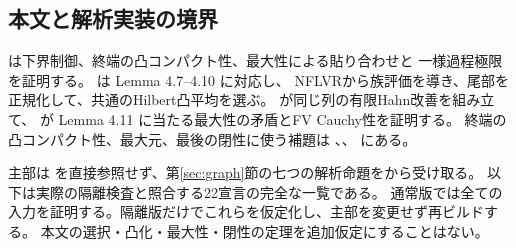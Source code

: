 \subsection*{本文と解析実装の境界}
 は下界制御、終端の凸コンパクト性、最大性による貼り合わせと
一様過程極限を証明する。 は Lemma 4.7--4.10 に対応し、
NFLVRから族評価を導き、尾部を正規化して、共通のHilbert凸平均を選ぶ。
 が同じ列の有限Hahn改善を組み立て、
 が Lemma 4.11 に当たる最大性の矛盾とFV Cauchy性を証明する。
終端の凸コンパクト性、最大元、最後の閉性に使う補題は
、、 にある。

主部は  を直接参照せず、第\ref{sec:graph}節の七つの解析命題をから受け取る。
以下は実際の隔離検査と照合する22宣言の完全な一覧である。
通常版では全ての入力を証明する。隔離版だけでこれらを仮定化し、主部を変更せず再ビルドする。
本文の選択・凸化・最大性・閉性の定理を追加仮定にすることはない。

